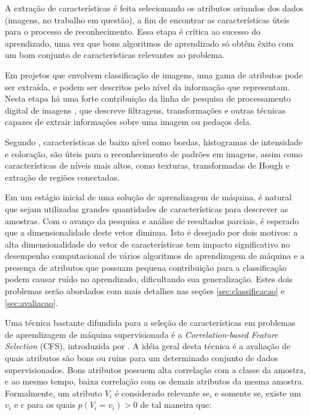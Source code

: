 A extração de características é feita selecionando os atributos oriundos dos dados (imagens, no trabalho em questão), a fim de encontrar as características úteis para o processo de reconhecimento. Essa etapa é crítica ao sucesso do aprendizado, uma vez que bons algoritmos de aprendizado só obtêm êxito com um bom conjunto de características relevantes ao problema.

Em projetos que envolvem classificação de imagens, uma gama de atributos pode ser extraída, e podem ser descritos pelo nível da informação que representam. Nesta etapa há uma forte contribuição da linha de pesquisa de processamento digital de imagens \cite{gonzalez:2002}, que descreve filtragens, transformações e outras técnicas capazes de extrair informações sobre uma imagem ou pedaços dela.

Segundo , características de baixo nível como bordas, histogramas de intensidade e coloração, são úteis para o reconhecimento de padrões em imagens, assim como características de níveis mais altos, como texturas, transformadas de Hough e extração de regiões conectadas.

Em um estágio inicial de uma solução de aprendizagem de máquina, é natural que sejam utilizadas grandes quantidades de características para descrever as amostras. Com o avanço da pesquisa e análise de resultados parciais, é esperado que a dimensionalidade deste vetor diminua. Isto é desejado por dois motivos: a alta dimensionalidade do vetor de características tem impacto significativo no desempenho computacional de vários algoritmos de aprendizagem de máquina e a presença de atributos que possuam pequena contribuição para a classificação podem causar ruído no aprendizado, dificultando sua generalização. Estes dois problemas serão abordados com mais detalhes nas seções \ref{sec:classificacao} e \ref{sec:avaliacao}.

Uma técnica bastante difundida para a seleção de características em problemas de aprendizagem de máquina supervisionada é a \textit{Correlation-based Feature Selection} (CFS), introduzida por . A idéia geral desta técnica é a avaliação de quais atributos são bons ou ruins para um determinado conjunto de dados supervisionados. Bons atributos possuem alta correlação com a classe da amostra, e ao mesmo tempo, baixa correlação com os demais atributos da mesma amostra. Formalmente, um atributo $V_i$ é considerado relevante se, e somente se, existe um $v_i$ e $c$ para os quais $p(V_i = v_i) > 0$ de tal maneira que:

